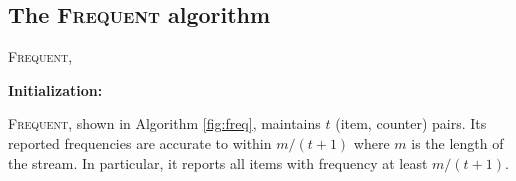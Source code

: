 \documentclass[sigconf,review=true,anonymous=true,screen]{acmart}
\begin{document}
\subsection{The \textsc{Frequent} algorithm}   
    \begin{algorithm}
    	\caption{\textsc{Frequent}, \cite{MG82}}
	\label{fig:freq}
    	\SetAlgoLined
	

	\textbf{Initialization:}

    \end{algorithm}

    \vspace*{.5cm}
\textsc{Frequent}, shown in Algorithm \ref{fig:freq}, maintains $t$ (item, counter) pairs. Its reported frequencies are accurate to within $m/(t+1)$ where $m$ is the length of the stream. In particular, it reports all items with frequency at least $m/(t+1)$. 
\end{document}
